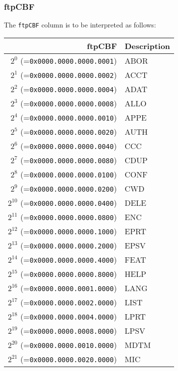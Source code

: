 \documentclass[documentation]{subfiles}
\begin{document}
\subsubsection{ftpCBF}\label{ftpCBF}
The {\tt ftpCBF} column is to be interpreted as follows:\\
\begin{minipage}{0.49\textwidth}
    \begin{longtable}{rl}
        \toprule
        {\bf ftpCBF} & {\bf Description} \\
        \midrule\endhead%
        $2^{0}$  (={\tt 0x0000.0000.0000.0001}) & ABOR\\
        $2^{1}$  (={\tt 0x0000.0000.0000.0002}) & ACCT\\
        $2^{2}$  (={\tt 0x0000.0000.0000.0004}) & ADAT\\
        $2^{3}$  (={\tt 0x0000.0000.0000.0008}) & ALLO\\
        $2^{4}$  (={\tt 0x0000.0000.0000.0010}) & APPE\\
        $2^{5}$  (={\tt 0x0000.0000.0000.0020}) & AUTH\\
        $2^{6}$  (={\tt 0x0000.0000.0000.0040}) & CCC\\
        $2^{7}$  (={\tt 0x0000.0000.0000.0080}) & CDUP\\
        $2^{8}$  (={\tt 0x0000.0000.0000.0100}) & CONF\\
        $2^{9}$  (={\tt 0x0000.0000.0000.0200}) & CWD\\
        $2^{10}$ (={\tt 0x0000.0000.0000.0400}) & DELE\\
        $2^{11}$ (={\tt 0x0000.0000.0000.0800}) & ENC\\
        $2^{12}$ (={\tt 0x0000.0000.0000.1000}) & EPRT\\
        $2^{13}$ (={\tt 0x0000.0000.0000.2000}) & EPSV\\
        $2^{14}$ (={\tt 0x0000.0000.0000.4000}) & FEAT\\
        $2^{15}$ (={\tt 0x0000.0000.0000.8000}) & HELP\\
        $2^{16}$ (={\tt 0x0000.0000.0001.0000}) & LANG\\
        $2^{17}$ (={\tt 0x0000.0000.0002.0000}) & LIST\\
        $2^{18}$ (={\tt 0x0000.0000.0004.0000}) & LPRT\\
        $2^{19}$ (={\tt 0x0000.0000.0008.0000}) & LPSV\\
        $2^{20}$ (={\tt 0x0000.0000.0010.0000}) & MDTM\\
        $2^{21}$ (={\tt 0x0000.0000.0020.0000}) & MIC\\

\end{longtable}
\end{minipage}
\end{document}
